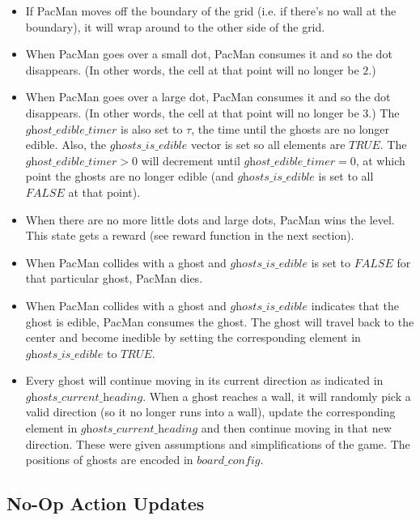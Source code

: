 \documentclass[paper=a4, fontsize=11pt]{scrartcl}
\begin{document}
\begin{itemize}
\item If PacMan moves off the boundary of the grid (i.e. if there's no wall at the boundary), it will wrap around to the other side of the grid.

\item When PacMan goes over a small dot, PacMan consumes it and so the dot disappears. (In other words, the cell at that point will no longer be $2$.)

\item When PacMan goes over a large dot, PacMan consumes it and so the dot disappears.  (In other words, the cell at that point will no longer be $3$.) The $\textit{ghost\_edible\_timer}$ is also set to $\tau$, the time until the ghosts are no longer edible. Also, the $\textit{ghosts\_is\_edible}$ vector is set so all elements are $TRUE$. The $\textit{ghost\_edible\_timer} > 0$ will decrement until $\textit{ghost\_edible\_timer} = 0$, at which point the ghosts are no longer edible (and $\textit{ghosts\_is\_edible}$ is set to all $FALSE$ at that point).

\item When there are no more little dots and large dots, PacMan wins the level. This state gets a reward (see reward function in the next section).

\item When PacMan collides with a ghost and $\textit{ghosts\_is\_edible}$ is set to $FALSE$ for that particular ghost, PacMan dies.

\item When PacMan collides with a ghost and $\textit{ghosts\_is\_edible}$ indicates that the ghost is edible, PacMan consumes the ghost. The ghost will travel back to the center and become inedible by setting the corresponding element in $\textit{ghosts\_is\_edible}$ to $TRUE$.

\item Every ghost will continue moving in its current direction as indicated in $\textit{ghosts\_current\_heading}$. When a ghost reaches a wall, it will randomly pick a valid direction (so it no longer runs into a wall), update the corresponding element in $\textit{ghosts\_current\_heading}$ and then continue moving in that new direction. These were given assumptions and simplifications of the game. The positions of ghosts are encoded in $\textit{board\_config}$.
\end{itemize}

\subsection{No-Op Action Updates}
\end{document}
